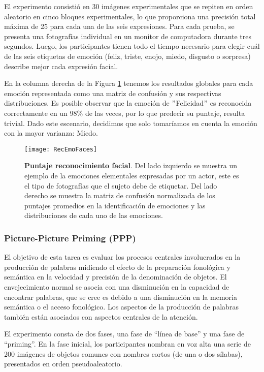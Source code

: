 \documentclass[11pt,letterpaper]{article}
\numberwithin{equation}{subsection}
\numberwithin{table}{subsection}
\begin{document}
\bigskip
\noindent El experimento consistió en 30 imágenes experimentales que se repiten en orden aleatorio en cinco bloques experimentales, lo que proporciona una precisión total máxima de 25 para cada una de las seis expresiones. Para cada prueba, se presenta una fotografías individual en un monitor de computadora durante tres segundos. Luego, los participantes tienen todo el tiempo necesario para elegir cuál de las seis etiquetas de emoción (feliz, triste, enojo, miedo, disgusto o sorpresa) describe mejor cada expresión facial. 

\bigskip
\noindent En la columna derecha de la Figura \ref{fig:RecEmoFaces} tenemos los resultados globales para cada emoción representada como una matriz de confusión y sus respectivas distribuciones. Es posible observar que la emoción de $"$Felicidad$"$ es reconocida correctamente en un 98\% de las veces, por lo que predecir su puntaje, resulta trivial. Dado este escenario, decidimos que solo tomaríamos en cuenta la emoción con la mayor varianza: Miedo. 

\begin{figure}[H]
\centering
	\texttt{[image: RecEmoFaces]}
	\captionsetup{labelfont=bf}
	\caption{\scriptsize \textbf{Puntaje reconocimiento facial}. Del lado izquierdo se muestra un ejemplo de la emociones elementales expresadas por un actor, este es el tipo de fotografías que el sujeto debe de etiquetar. Del lado derecho se muestra la matriz de confusión normalizada de los puntajes promedios en la identificación de emociones y las distribuciones de cada uno de las emociones.}
	\label{fig:RecEmoFaces}
\end{figure}

\subsubsection{Picture-Picture Priming (PPP) }

\smallskip
\noindent El objetivo de esta tarea es evaluar los procesos centrales involucrados en la producción de palabras midiendo el efecto de la preparación fonológica y semántica en la velocidad y precisión de la denominación de objetos. El envejecimiento normal se asocia con una disminución en la capacidad de encontrar palabras, que se cree es debido a una disminución en la memoria semántica o el acceso fonológico. Los aspectos de la producción de palabras también están asociados con aspectos centrales de la atención.

\bigskip
\noindent El experimento consta de dos fases, una fase de “línea de base” y una fase de “priming”. En la fase inicial, los participantes nombran en voz alta una serie de 200 imágenes de objetos comunes con nombres cortos (de una o dos sílabas), presentados en orden pseudoaleatorio. 
\end{document}
